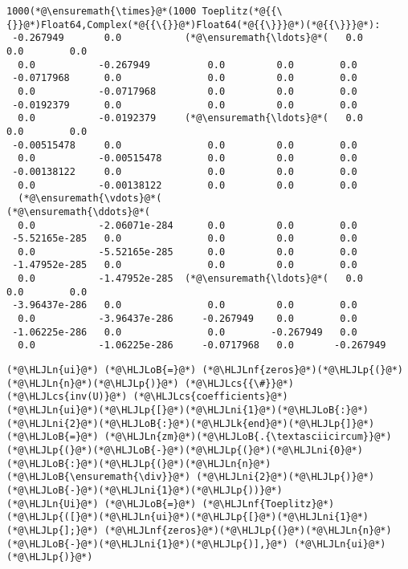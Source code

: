 \documentclass[12pt,landscape]{article}
\newcommand{\HLJLk}[1]{\textcolor[RGB]{148,91,176}{\textbf{#1}}}
\newcommand{\HLJLn}[1]{#1}
\newcommand{\HLJLnf}[1]{\textcolor[RGB]{66,102,213}{#1}}
\newcommand{\HLJLni}[1]{\textcolor[RGB]{59,151,46}{#1}}
\newcommand{\HLJLoB}[1]{\textcolor[RGB]{102,102,102}{\textbf{#1}}}
\newcommand{\HLJLp}[1]{#1}
\newcommand{\HLJLcs}[1]{\textcolor[RGB]{153,153,119}{\textit{#1}}}
\begin{document}
{\begin{lstlisting}
1000(*@\ensuremath{\times}@*(1000 Toeplitz(*@{{\{}}@*)Float64,Complex(*@{{\{}}@*)Float64(*@{{\}}}@*)(*@{{\}}}@*):
 -0.267949       0.0           (*@\ensuremath{\ldots}@*(   0.0         0.0        0.0
  0.0           -0.267949          0.0         0.0        0.0
 -0.0717968      0.0               0.0         0.0        0.0
  0.0           -0.0717968         0.0         0.0        0.0
 -0.0192379      0.0               0.0         0.0        0.0
  0.0           -0.0192379     (*@\ensuremath{\ldots}@*(   0.0         0.0        0.0
 -0.00515478     0.0               0.0         0.0        0.0
  0.0           -0.00515478        0.0         0.0        0.0
 -0.00138122     0.0               0.0         0.0        0.0
  0.0           -0.00138122        0.0         0.0        0.0
  (*@\ensuremath{\vdots}@*(                            (*@\ensuremath{\ddots}@*(                         
  0.0           -2.06071e-284      0.0         0.0        0.0
 -5.52165e-285   0.0               0.0         0.0        0.0
  0.0           -5.52165e-285      0.0         0.0        0.0
 -1.47952e-285   0.0               0.0         0.0        0.0
  0.0           -1.47952e-285  (*@\ensuremath{\ldots}@*(   0.0         0.0        0.0
 -3.96437e-286   0.0               0.0         0.0        0.0
  0.0           -3.96437e-286     -0.267949    0.0        0.0
 -1.06225e-286   0.0               0.0        -0.267949   0.0
  0.0           -1.06225e-286     -0.0717968   0.0       -0.267949
\end{lstlisting}


\begin{lstlisting}
(*@\HLJLn{ui}@*) (*@\HLJLoB{=}@*) (*@\HLJLnf{zeros}@*)(*@\HLJLp{(}@*)(*@\HLJLn{n}@*)(*@\HLJLp{)}@*) (*@\HLJLcs{{\#}}@*) (*@\HLJLcs{inv(U)}@*) (*@\HLJLcs{coefficients}@*)
(*@\HLJLn{ui}@*)(*@\HLJLp{[}@*)(*@\HLJLni{1}@*)(*@\HLJLoB{:}@*)(*@\HLJLni{2}@*)(*@\HLJLoB{:}@*)(*@\HLJLk{end}@*)(*@\HLJLp{]}@*) (*@\HLJLoB{=}@*) (*@\HLJLn{zm}@*)(*@\HLJLoB{.{\textasciicircum}}@*)(*@\HLJLp{(}@*)(*@\HLJLoB{-}@*)(*@\HLJLp{(}@*)(*@\HLJLni{0}@*)(*@\HLJLoB{:}@*)(*@\HLJLp{(}@*)(*@\HLJLn{n}@*) (*@\HLJLoB{\ensuremath{\div}}@*) (*@\HLJLni{2}@*)(*@\HLJLp{)}@*)(*@\HLJLoB{-}@*)(*@\HLJLni{1}@*)(*@\HLJLp{))}@*)
(*@\HLJLn{Ui}@*) (*@\HLJLoB{=}@*) (*@\HLJLnf{Toeplitz}@*)(*@\HLJLp{([}@*)(*@\HLJLn{ui}@*)(*@\HLJLp{[}@*)(*@\HLJLni{1}@*)(*@\HLJLp{];}@*) (*@\HLJLnf{zeros}@*)(*@\HLJLp{(}@*)(*@\HLJLn{n}@*)(*@\HLJLoB{-}@*)(*@\HLJLni{1}@*)(*@\HLJLp{)],}@*) (*@\HLJLn{ui}@*)(*@\HLJLp{)}@*)
\end{lstlisting}

}
\end{document}
